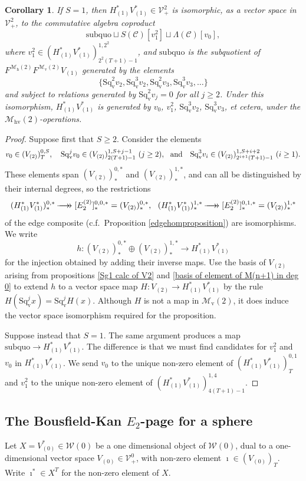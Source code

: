 \documentclass[11pt]{amsart} \renewcommand{\baselinestretch}{1.2}
\theoremstyle{plain}
\newtheorem{cor}[thm]{Corollary}
\theoremstyle{definition}
\renewcommand{\to}{\longrightarrow}
\newcommand{\scrC}{\mathscr{C}}
\newcommand{\calV}{\mathcal{V}}
\newcommand{\calw}{\mathcal{W}}
\newcommand{\calMv}{\mathcal{M}\dver}
\newcommand{\calMh}{\mathcal{M}\dhor}
\newcommand{\calMhv}{\mathcal{M}_\mathrm{hv}}
\newcommand{\CommOperad}{{\scrC}}
\newcommand{\vect}[2]{\calV^{#1}_{#2}}
\newcommand{\epi}{{\,\makebox[0cm][l]{\ensuremath\to}\to{}}}
\newcommand{\E}[5]{[E^{#1}_{#2}#3]^{#4}_{#5}}
\newcommand{\dver}{_\mathrm{v}}
\newcommand{\dhor}{_\mathrm{h}}
\newcommand{\Sqv}{\mathrm{Sq}\dver}
\begin{document}
\begin{Calculations of HWn}
\begin{cor}
If $S=1$, then $H^*_{(1)}V^*_{(1)}\in \vect{2}{+}$ is isomorphic, as a vector space in $\vect{2}{+}$, to the commutative algebra coproduct
\[\mathrm{subquo}\sqcup S(\CommOperad) [v_1^{2}]\sqcup \Lambda(\CommOperad)[v_0],\] where $v_1^2\in(H^*_{(1)}V^*_{(1)})^{1,2^2}_{2^2(T+1)-1}$, and $\mathrm{subquo}$ is the subquotient of $F^{\calMh(2)}F^{\calMv(2)}V_{(1)}$ generated by the elements
\[\{\Sqv^2v_{2},\Sqv^3v_{2},\Sqv^2v_{3},\Sqv^3v_{3},\ldots\}\]
and subject to relations generated by 
$\Sqv^2 v_{j}=0$ for all $j\geq2$. Under this isomorphism, $H^*_{(1)}V^*_{(1)}$ is generated by $v_0$, $ v_1^2$, $\Sqv^3 v_2$, $\Sqv^3 v_3$, et cetera, under the $\calMhv(2)$-operations.
\end{cor}
\begin{proof}
Suppose first that $S\geq2$. Consider the elements
\[v_0\in (V_{(2)})^{0,S}_{T},\ \ \ \Sqv^j v_0\in (V_{(2)})^{1,S+j-1}_{2(T+1)-1}\  \textup{($j\geq2$)},\ \ \textup{and}\ \ \ \Sqv^3v_i\in (V_{(2)})^{1,S+i+2}_{2^{i+1}(T+1)-1}\ \textup{($i\geq1$)}.\]
These elements span $(V_{(2)})^{0,*}_*$ and $(V_{(2)})^{1,*}_*$, and can all be distinguished by their internal degrees, so the restrictions 
\[(H^*_{(1)}V^*_{(1)})^{0,*}_*\epi \E{(2)}{2}{}{0,0,*}{*}=(V_{(2)})^{0,*}_*,\ \ (H^*_{(1)}V^*_{(1)})^{1,*}_*\epi \E{(2)}{2}{}{0,1,*}{*}=(V_{(2)})^{1,*}_*\]
 of the edge composite (c.f.\ Proposition \ref{edgehomproposition}) are isomorphisms. We write
\[h:(V_{(2)})^{0,*}_*\oplus (V_{(2)})^{1,*}_*\to H^*_{(1)}V^*_{(1)}\]
for the injection obtained by adding their inverse maps. Use the basis of $V_{(2)}$ arising from propositions \ref{Sg1 calc of V2} and \ref{basis of element of M(n+1) in deg 0} to extend $h$ to a vector space map $H:V_{(2)}\to H^*_{(1)}V^*_{(1)}$ by the rule $H(\Sqv^jx)=\Sqv^j H(x)$. Although $H$ is not a map in $\calMv(2)$, it does induce the vector space isomorphism required for the proposition.

Suppose instead that $S=1$. The same argument produces a map $\mathrm{subquo}\to H^*_{(1)}V^*_{(1)}$. The difference is that we must find candidates for $v_1^2$ and $v_0$ in $H^*_{(1)}V^*_{(1)}$. We send $v_0$ to the unique non-zero element of $(H^*_{(1)}V^*_{(1)})^{0,1}_{T}$ and $v_1^{2}$ to the unique non-zero element of $(H^*_{(1)}V^*_{(1)})^{1,4}_{4(T+1)-1}$.
\end{proof}






\subsection{The Bousfield-Kan $E_2$-page for a sphere}
\label{Calculations of HW0}
Let $X=V^*_{(0)}\in\calw(0)$ be a one dimensional object of $\calw(0)$, dual to a one-dimensional vector space $V_{(0)}\in\vect{0}{+}$, with non-zero element $\imath\in(V_{(0)})_T$. Write $\imath^*\in X^T$ for the non-zero element of $X$.


\end{Calculations of HWn}
\end{document}
